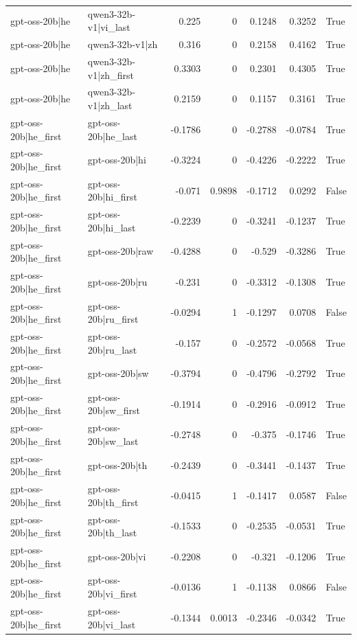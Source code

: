 \begin{table}
\begin{tabular}{l l r r r r l}
gpt-oss-20b|he & qwen3-32b-v1|vi_last & 0.225 & 0 & 0.1248 & 0.3252 & True \\
gpt-oss-20b|he & qwen3-32b-v1|zh & 0.316 & 0 & 0.2158 & 0.4162 & True \\
gpt-oss-20b|he & qwen3-32b-v1|zh_first & 0.3303 & 0 & 0.2301 & 0.4305 & True \\
gpt-oss-20b|he & qwen3-32b-v1|zh_last & 0.2159 & 0 & 0.1157 & 0.3161 & True \\
gpt-oss-20b|he_first & gpt-oss-20b|he_last & -0.1786 & 0 & -0.2788 & -0.0784 & True \\
gpt-oss-20b|he_first & gpt-oss-20b|hi & -0.3224 & 0 & -0.4226 & -0.2222 & True \\
gpt-oss-20b|he_first & gpt-oss-20b|hi_first & -0.071 & 0.9898 & -0.1712 & 0.0292 & False \\
gpt-oss-20b|he_first & gpt-oss-20b|hi_last & -0.2239 & 0 & -0.3241 & -0.1237 & True \\
gpt-oss-20b|he_first & gpt-oss-20b|raw & -0.4288 & 0 & -0.529 & -0.3286 & True \\
gpt-oss-20b|he_first & gpt-oss-20b|ru & -0.231 & 0 & -0.3312 & -0.1308 & True \\
gpt-oss-20b|he_first & gpt-oss-20b|ru_first & -0.0294 & 1 & -0.1297 & 0.0708 & False \\
gpt-oss-20b|he_first & gpt-oss-20b|ru_last & -0.157 & 0 & -0.2572 & -0.0568 & True \\
gpt-oss-20b|he_first & gpt-oss-20b|sw & -0.3794 & 0 & -0.4796 & -0.2792 & True \\
gpt-oss-20b|he_first & gpt-oss-20b|sw_first & -0.1914 & 0 & -0.2916 & -0.0912 & True \\
gpt-oss-20b|he_first & gpt-oss-20b|sw_last & -0.2748 & 0 & -0.375 & -0.1746 & True \\
gpt-oss-20b|he_first & gpt-oss-20b|th & -0.2439 & 0 & -0.3441 & -0.1437 & True \\
gpt-oss-20b|he_first & gpt-oss-20b|th_first & -0.0415 & 1 & -0.1417 & 0.0587 & False \\
gpt-oss-20b|he_first & gpt-oss-20b|th_last & -0.1533 & 0 & -0.2535 & -0.0531 & True \\
gpt-oss-20b|he_first & gpt-oss-20b|vi & -0.2208 & 0 & -0.321 & -0.1206 & True \\
gpt-oss-20b|he_first & gpt-oss-20b|vi_first & -0.0136 & 1 & -0.1138 & 0.0866 & False \\
gpt-oss-20b|he_first & gpt-oss-20b|vi_last & -0.1344 & 0.0013 & -0.2346 & -0.0342 & True \\

\end{tabular}
\end{table}
